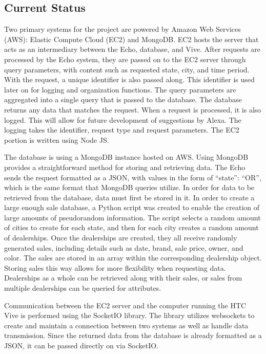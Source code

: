 \documentclass[onecolumn, draftclsnofoot,10pt, compsoc]{IEEEtran}
\begin{document}
    \subsection{Current Status}
    Two primary systems for the project are powered by Amazon Web Services (AWS): Elastic Compute Cloud (EC2) and MongoDB. EC2 hosts the server that acts as an intermediary between the Echo, database, and Vive. After requests are processed by the Echo system, they are passed on to the EC2 server through query parameters, with content such as requested state, city, and time period. With the request, a unique identifier is also passed along. This identifier is used later on for logging and organization functions. The query parameters are aggregated into a single query that is passed to the database. The database returns any data that matches the request. When a request is processed, it is also logged. This will allow for future development of suggestions by Alexa. The logging takes the identifier, request type and request parameters. The EC2 portion is written using Node JS.

    The database is using a MongoDB instance hosted on AWS. Using MongoDB provides a straightforward method for storing and retrieving data. The Echo sends the request formatted as a JSON, with values in the form of “state”: “OR”, which is the same format that MongoDB queries utilize. In order for data to be retrieved from the database, data must first be stored in it. In order to create a large enough sale database, a Python script was created to enable the creation of large amounts of pseudorandom information. The script selects a random amount of cities to create for each state, and then for each city creates a random amount of dealerships. Once the dealerships are created, they all receive randomly generated sales, including details such as date, brand, sale price, owner, and color. The sales are stored in an array within the corresponding dealership object. Storing sales this way allows for more flexibility when requesting data. Dealerships as a whole can be retrieved along with their sales, or sales from multiple dealerships can be queried for attributes.

    Communication between the EC2 server and the computer running the HTC Vive is performed using the SocketIO library. The library utilizes websockets to create and maintain a connection between two systems as well as handle data transmission. Since the returned data from the database is already formatted as a JSON, it can be passed directly on via SocketIO.
\end{document}
